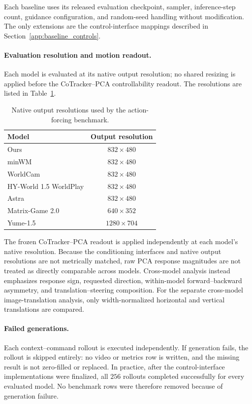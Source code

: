 \documentclass[letterpaper]{article} %
\begin{document}
Each baseline uses its released evaluation checkpoint, sampler, inference-step
count, guidance configuration, and random-seed handling without modification.
The only extensions are the control-interface mappings described in
Section~\ref{app:baseline_controls}.

\paragraph{Evaluation resolution and motion readout.}
Each model is evaluated at its native output resolution; no shared resizing is
applied before the CoTracker--PCA controllability readout. The resolutions are
listed in Table~\ref{tab:action_forcing_resolutions}.

\begin{table}[t]
\centering
{
\small
\begin{tabular}{lc}
\toprule
Model & Output resolution \\
\midrule
Ours                   & $832\times480$  \\
minWM                  & $832\times480$  \\
WorldCam               & $832\times480$  \\
HY-World 1.5 WorldPlay & $832\times480$  \\
Astra                  & $832\times480$  \\
Matrix-Game 2.0        & $640\times352$  \\
Yume-1.5               & $1280\times704$ \\
\bottomrule
\end{tabular}
}
\caption{
    Native output resolutions used by the action-forcing benchmark.
}
\label{tab:action_forcing_resolutions}
\end{table}

The frozen CoTracker--PCA readout is applied independently at each model's
native resolution. Because the conditioning interfaces and native output
resolutions are not metrically matched, raw PCA response magnitudes are not
treated as directly comparable across models. Cross-model analysis instead
emphasizes response sign, requested direction, within-model
forward--backward asymmetry, and translation--steering composition. For the
separate cross-model image-translation analysis, only width-normalized
horizontal and vertical translations are compared.

\paragraph{Failed generations.}
Each context--command rollout is executed independently. If generation fails,
the rollout is skipped entirely: no video or metrics row is written, and the
missing result is not zero-filled or replaced. In practice, after the
control-interface implementations were finalized, all $256$ rollouts
completed successfully for every evaluated model. No benchmark rows were
therefore removed because of generation failure.
\end{document}
